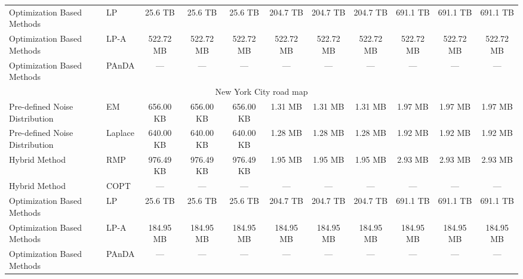 \begin{table}[t]
{\begin{tabular}{ll|ccc|ccc|ccc}
Optimization Based Methods & LP & 25.6 TB & 25.6 TB & 25.6 TB & 204.7 TB & 204.7 TB & 204.7 TB & 691.1 TB & 691.1 TB & 691.1 TB \\
Optimization Based Methods & LP-A & 522.72 MB & 522.72 MB & 522.72 MB & 522.72 MB & 522.72 MB & 522.72 MB & 522.72 MB & 522.72 MB & 522.72 MB \\
Optimization Based Methods & PAnDA & --- & --- & --- & --- & --- & --- & --- & --- & --- \\
\hline
\multicolumn{11}{c}{New York City road map} \\
\hline
Pre-defined Noise Distribution & EM & 656.00 KB & 656.00 KB & 656.00 KB & 1.31 MB & 1.31 MB & 1.31 MB & 1.97 MB & 1.97 MB & 1.97 MB \\
Pre-defined Noise Distribution & Laplace & 640.00 KB & 640.00 KB & 640.00 KB & 1.28 MB & 1.28 MB & 1.28 MB & 1.92 MB & 1.92 MB & 1.92 MB \\
Hybrid Method & RMP & 976.49 KB & 976.49 KB & 976.49 KB & 1.95 MB & 1.95 MB & 1.95 MB & 2.93 MB & 2.93 MB & 2.93 MB \\
Hybrid Method & COPT & --- & --- & --- & --- & --- & --- & --- & --- & --- \\
Optimization Based Methods & LP & 25.6 TB & 25.6 TB & 25.6 TB & 204.7 TB & 204.7 TB & 204.7 TB & 691.1 TB & 691.1 TB & 691.1 TB \\
Optimization Based Methods & LP-A & 184.95 MB & 184.95 MB & 184.95 MB & 184.95 MB & 184.95 MB & 184.95 MB & 184.95 MB & 184.95 MB & 184.95 MB \\
Optimization Based Methods & PAnDA & --- & --- & --- & --- & --- & --- & --- & --- & --- \\
\hline
\end{tabular}%
}
\end{table}
